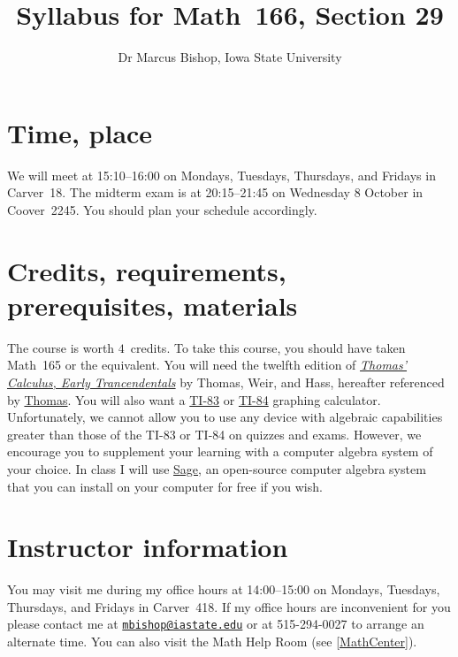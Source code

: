 \documentclass[11pt]{article}
\title{Syllabus for Math~166, Section 29}
\author{Dr Marcus Bishop, Iowa State University}
\begin{document}
\maketitle

\section{Time, place}\label{Time}
We will meet at 15:10--16:00
on Mondays, Tuesdays, Thursdays, and Fridays
in Carver~18.
The midterm exam is at 20:15--21:45
on Wednesday 8 October in Coover~2245.
You should plan your schedule accordingly.

\section{Credits, requirements, prerequisites, materials}\label{Require}
The course is worth $4$~credits.
To take this course, you should have taken Math~165
or the equivalent. You will need the twelfth edition of 
\href{http://wps.aw.com/aw_thomas_calculus_series}
{\em Thomas' Calculus, Early Trancendentals}
by Thomas, Weir, and Hass, hereafter referenced by
\href{http://wps.aw.com/aw_thomas_calculus_series}{Thomas}.
You will also want a 
\href{http://en.wikipedia.org/wiki/TI-83}{TI-83} or
\href{http://en.wikipedia.org/wiki/TI-84}{TI-84}
graphing calculator. Unfortunately, we cannot allow you to use
any device with algebraic capabilities greater than those of the TI-83
or TI-84 on quizzes and exams. However, we encourage
you to supplement your learning with a computer algebra system
of your choice.
In class I will use \href{http://www.sagemath.org}{\textsf Sage},
an open-source computer algebra system that you can install on your
computer for free if you wish.

\section{Instructor information} You may visit me during my office 
hours at 14:00--15:00 on Mondays, Tuesdays, Thursdays, and Fridays
in Carver~418. If my office hours are inconvenient for you
please contact me at 
\href{mailto:mbishop@iastate.edu}{\tt mbishop@iastate.edu} or at 
515-294-0027 to arrange an alternate time.
You can also visit the Math Help Room (see \autoref{MathCenter}).
\end{document}
